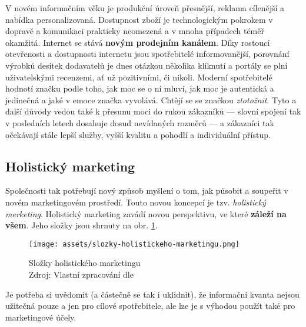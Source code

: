 V novém informačním věku je produkční úroveň přesnější, reklama cílenější a nabídka personalizovaná. Dostupnost zboží je technologickým pokrokem v dopravě a komunikaci prakticky neomezená a v mnoha případech téměř okamžitá. Internet se stává \textbf{novým prodejním kanálem}. Díky rostoucí otevřenosti a dostupnosti internetu jsou spotřebitelé informovanější, porovnání výrobků desítek dodavatelů je dnes otázkou několika kliknutí a portály se plní uživatelskými recenzemi, ať už pozitivními, či nikoli.
Moderní spotřebitelé hodnotí značku podle toho, jak moc se o ní mluví, jak moc je autentická a jedinečná a jaké v emoce značka vyvolává. Chtějí se se značkou \textit{ztotožnit}.\cite{bergh2012coolznacky}
Tyto a další důvody vedou také k přesunu moci do rukou zákazníků --- slovní spojení  tak v posledních letech dosahuje dosud nevídaných rozměrů --- a zákazníci tak očekávají stále lepší služby, vyšší kvalitu a pohodlí a individuální přístup.

\subsection{Holistický marketing}

Společnosti tak potřebují nový způsob myšlení o tom, jak působit a soupeřit v novém marketingovém prostředí. Touto novou koncepcí je tzv. \textit{holistický merketing}.
\cite{kotler2007marketingmanagement} Holistický marketing zavádí novou perspektivu, ve které \textbf{záleží na všem}. Jeho složky jsou shrnuty na obr. \ref{fig:slozky-holistickeho-marketingu}.

\begin{figure}[htbp!]
    \centering
    \texttt{[image: assets/slozky-holistickeho-marketingu.png]}
    \caption[Složky holistického marketingu]{Složky holistického marketingu \\ Zdroj: Vlastní zpracování dle \textcite[s. 56]{kotler2007marketingmanagement}}
    \label{fig:slozky-holistickeho-marketingu}
\end{figure}

Je potřeba si uvědomit (a částečně se tak i uklidnit), že informační kvanta nejsou užitečná pouze a jen pro cílové spotřebitele, ale lze je s výhodou použít také pro marketingové účely.